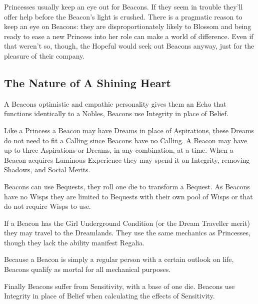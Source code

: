 Princesses usually keep an eye out for Beacons. If they seem in trouble they’ll offer help before the Beacon’s light is crushed. There is a pragmatic reason to keep an eye on Beacons: they are disproportionately likely to Blossom and being ready to ease a new Princess into her role can make a world of difference. Even if that weren’t so, though, the Hopeful would seek out Beacons anyway, just for the pleasure of their company.

\subsection*{The Nature of A Shining Heart}

A Beacons optimistic and empathic personality gives them an Echo that functions identically to a Nobles, Beacons use Integrity in place of Belief.

Like a Princess a Beacon may have Dreams in place of Aspirations, these Dreams do not need to fit a Calling since Beacons have no Calling. A Beacon may have up to three Aspirations or Dreams, in any combination, at a time. When a Beacon acquires Luminous Experience they may spend it on Integrity, removing Shadows, and Social Merits.

Beacons can use Bequests, they roll one die to transform a Bequest. As Beacons have no Wisps they are limited to Bequests with their own pool of Wisps or that do not require Wisps to use.

If a Beacon has the Girl Underground Condition (or the Dream Traveller merit) they may travel to the Dreamlands. They use the same mechanics as Princesses, though they lack the ability manifest Regalia.

Because a Beacon is simply a regular person with a certain outlook on life, Beacons qualify as mortal for all mechanical purposes. 

Finally Beacons suffer from Sensitivity, with a base of one die. Beacons use Integrity in place of Belief when calculating the effects of Sensitivity. 



